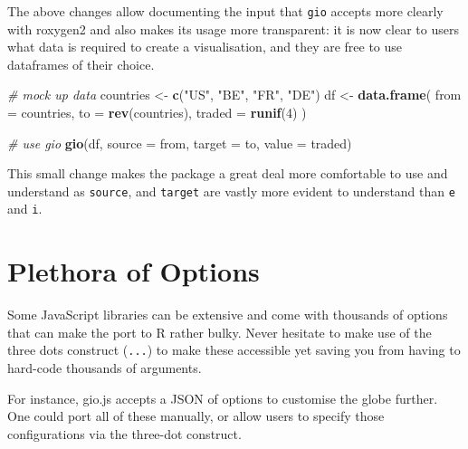 \documentclass[10pt,]{krantz}
\makeatletter
\newenvironment{Shaded}{\begin{snugshade}}{\end{snugshade}}
\newcommand{\CommentTok}[1]{\textcolor[rgb]{0.37,0.37,0.37}{\textit{#1}}}
\newcommand{\DataTypeTok}[1]{\textcolor[rgb]{0.27,0.27,0.27}{#1}}
\newcommand{\DecValTok}[1]{\textcolor[rgb]{0.06,0.06,0.06}{#1}}
\newcommand{\KeywordTok}[1]{\textcolor[rgb]{0.27,0.27,0.27}{\textbf{#1}}}
\newcommand{\NormalTok}[1]{#1}
\newcommand{\StringTok}[1]{\textcolor[rgb]{0.5,0.5,0.5}{#1}}
\newenvironment{kframe}{%
\medskip{}
\setlength{\fboxsep}{.8em}
 \def\at@end@of@kframe{}%
 \ifinner\ifhmode%
  \def\at@end@of@kframe{\end{minipage}}%
  \begin{minipage}{\columnwidth}%
 \fi\fi%
 \def\FrameCommand##1{\hskip\@totalleftmargin \hskip-\fboxsep
 \colorbox{shadecolor}{##1}\hskip-\fboxsep
     \hskip-\linewidth \hskip-\@totalleftmargin \hskip\columnwidth}%
 \MakeFramed {\advance\hsize-\width
   \@totalleftmargin\z@ \linewidth\hsize
   \@setminipage}}%
 {\par\unskip\endMakeFramed%
 \at@end@of@kframe}
\renewenvironment{Shaded}{\begin{kframe}}{\end{kframe}}
\makeatother
\begin{document}
The above changes allow documenting the input that \texttt{gio} accepts more clearly with roxygen2 and also makes its usage more transparent: it is now clear to users what data is required to create a visualisation, and they are free to use dataframes of their choice.

\begin{Shaded}
\begin{Highlighting}[]
\CommentTok{# mock up data}
\NormalTok{countries <-}\StringTok{ }\KeywordTok{c}\NormalTok{(}\StringTok{"US"}\NormalTok{, }\StringTok{"BE"}\NormalTok{, }\StringTok{"FR"}\NormalTok{, }\StringTok{"DE"}\NormalTok{)}
\NormalTok{df <-}\StringTok{ }\KeywordTok{data.frame}\NormalTok{(}
  \DataTypeTok{from =}\NormalTok{ countries,}
  \DataTypeTok{to =} \KeywordTok{rev}\NormalTok{(countries),}
  \DataTypeTok{traded =} \KeywordTok{runif}\NormalTok{(}\DecValTok{4}\NormalTok{)}
\NormalTok{)}

\CommentTok{# use gio}
\KeywordTok{gio}\NormalTok{(df, }\DataTypeTok{source =}\NormalTok{ from, }\DataTypeTok{target =}\NormalTok{ to, }\DataTypeTok{value =}\NormalTok{ traded)}
\end{Highlighting}
\end{Shaded}

This small change makes the package a great deal more comfortable to use and understand as \texttt{source}, and \texttt{target} are vastly more evident to understand than \texttt{e} and \texttt{i}.

\hypertarget{widgets-final-options}{%
\section{Plethora of Options}\label{widgets-final-options}}

Some JavaScript libraries can be extensive and come with thousands of options that can make the port to R rather bulky. Never hesitate to make use of the three dots construct (\texttt{...}) to make these accessible yet saving you from having to hard-code thousands of arguments.

For instance, gio.js accepts a JSON of options to customise the globe further. One could port all of these manually, or allow users to specify those configurations via the three-dot construct.
\end{document}

